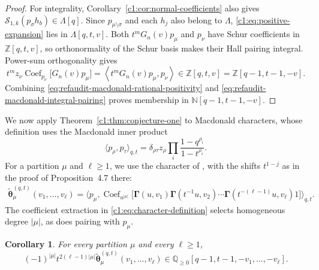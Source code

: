 \documentclass[12pt,reqno,a4paper]{amsart}
\numberwithin{equation}{section}
\numberwithin{figure}{section}
\theoremstyle{plain}
\newtheorem{corollary}[theorem]{Corollary}
\theoremstyle{definition}
\DeclareMathOperator{\Coef}{Coef}
\begin{document}
\begin{proof}
For integrality, Corollary~\ref{c1:cor:normal-coefficients} also gives
$\mathcal S_{1,k}(p_\sigma h_b)\in\Lambda[q]$.
Since $p_{\mu\setminus\sigma}$ and each $h_j$ also belong to
$\Lambda$, \eqref{c1:eq:positive-expansion} lies in
$\Lambda[q,t,v]$.  Both $t^mG_n(v)p_\mu$ and $p_\nu$
have Schur coefficients in $\mathbb Z[q,t,v]$, so orthonormality
of the Schur basis makes their Hall pairing integral.
Power-sum orthogonality gives
\begin{equation}\label{eq:refaudit-macdonald-integral-pairing}
 t^mz_\nu\Coef_{p_\nu}\bigl[G_n(v)p_\mu\bigr]
 =\left\langle t^mG_n(v)p_\mu,p_\nu\right\rangle
       \in\mathbb Z[q,t,v]
       =\mathbb Z[q-1,t-1,-v].
\end{equation}
Combining \eqref{eq:refaudit-macdonald-rational-positivity} and
\eqref{eq:refaudit-macdonald-integral-pairing} proves membership in
$\mathbb N[q-1,t-1,-v]$.
\end{proof}

We now apply Theorem~\ref{c1:thm:conjecture-one} to Macdonald
characters, whose definition uses the Macdonald inner product
\[
 \langle p_\rho,p_\tau\rangle_{q,t}
 =\delta_{\rho\tau}z_\rho
       \prod_i\frac{1-q^{\rho_i}}{1-t^{\rho_i}}.
\]
For a partition $\mu$ and $\ell\geq1$, we use the character of
\cite[Definition~1.4]{BD26}, with the shifts $t^{1-j}$ as in the
proof of Proposition~4.7 there:
\begin{equation}\label{c1:eq:character-definition}
 \begin{aligned}
 \widetilde{\boldsymbol\theta}_\mu^{(q,t)}(v_1,\ldots,v_\ell)
 =\bigl\langle p_\mu,
 \Coef_{u^{|\mu|}}\bigl[\boldsymbol\Gamma(u,v_1)
  \boldsymbol\Gamma(t^{-1}u,v_2)\cdots
  \boldsymbol\Gamma(t^{-(\ell-1)}u,v_\ell)1\bigr]
                 \bigr\rangle_{q,t}.
 \end{aligned}
\end{equation}
The coefficient extraction in \eqref{c1:eq:character-definition}
selects homogeneous degree $|\mu|$, as does pairing with $p_\mu$.

\begin{corollary}\label{c1:cor:character-positivity}
For every partition $\mu$ and every $\ell\geq1$,
\[
 (-1)^{|\mu|}t^{2(\ell-1)|\mu|}
   \widetilde{\boldsymbol\theta}_\mu^{(q,t)}(v_1,\ldots,v_\ell)
 \in\mathbb Q_{\geq0}[q-1,t-1,-v_1,\ldots,-v_\ell].
\]
\end{corollary}
\end{document}
